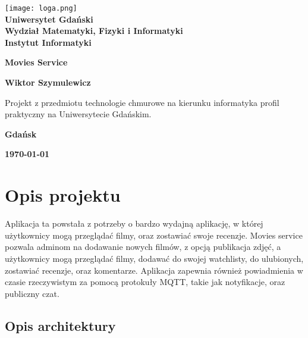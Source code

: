\documentclass[12pt,a4paper]{article}
\newcommand{\hmwkTitle}{Movies Service} %
\newcommand{\hmwkDueDate}{\today} %
\newcommand{\hmwkAuthorName}{Wiktor Szymulewicz} %
\begin{document}
\begin{titlepage}
    \vfill
	\begin{center}
	\hspace*{-1cm}
	\vspace*{0.5cm}
    \texttt{[image: loga.png]}\\
	\textbf{Uniwersytet Gdański \\ [0.05cm]Wydział Matematyki, Fizyki i Informatyki \\ [0.05cm] Instytut Informatyki}

	\vspace{0.6cm}
	\vspace{4cm}
	{\huge \textbf{\hmwkTitle}}\vspace{8mm}
	
	{\large \textbf{\hmwkAuthorName}}\\[3cm]
	
		\hspace{.45\textwidth} %
	   \begin{minipage}{.5\textwidth}
	   Projekt z przedmiotu technologie chmurowe na kierunku informatyka profil praktyczny na Uniwersytecie Gdańskim.\\[0.1cm]
	  \end{minipage}
	  \vfill
	
	\textbf{Gdańsk}
	
	\textbf{\hmwkDueDate}
	\end{center}
	
\end{titlepage}

\newpage
\setcounter{secnumdepth}{5}
\tableofcontents
\newpage

\section{Opis projektu}
\label{sec:Project}

Aplikacja ta powstała z potrzeby o bardzo wydajną aplikację, w której użytkownicy mogą przeglądać filmy, oraz zostawiać swoje recenzje. Movies service pozwala adminom na dodawanie nowych filmów, z opcją publikacja zdjęć, a użytkownicy mogą przeglądać filmy, dodawać do swojej watchlisty, do ulubionych, zostawiać recenzje, oraz komentarze. Aplikacja zapewnia również powiadmienia w czasie rzeczywistym za pomocą protokuły MQTT, takie jak notyfikacje, oraz publiczny czat.

\subsection{Opis architektury}
\label{sec:introduction}
\end{document}

